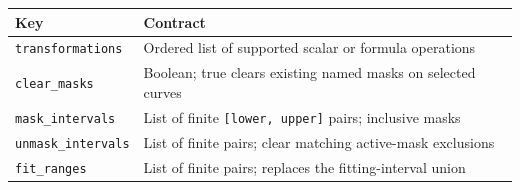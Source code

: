 \documentclass[
  10pt,
  a4paper,
  oneside]{scrreprt}
\begin{document}
\begin{longtable}[]{@{}ll@{}}
\toprule
\begin{minipage}[b]{0.47\columnwidth}\raggedright
Key\strut
\end{minipage} & \begin{minipage}[b]{0.47\columnwidth}\raggedright
Contract\strut
\end{minipage}\tabularnewline
\midrule
\endhead
\begin{minipage}[t]{0.47\columnwidth}\raggedright
\texttt{transformations}\strut
\end{minipage} & \begin{minipage}[t]{0.47\columnwidth}\raggedright
Ordered list of supported scalar or formula operations\strut
\end{minipage}\tabularnewline
\begin{minipage}[t]{0.47\columnwidth}\raggedright
\texttt{clear\_masks}\strut
\end{minipage} & \begin{minipage}[t]{0.47\columnwidth}\raggedright
Boolean; true clears existing named masks on selected curves\strut
\end{minipage}\tabularnewline
\begin{minipage}[t]{0.47\columnwidth}\raggedright
\texttt{mask\_intervals}\strut
\end{minipage} & \begin{minipage}[t]{0.47\columnwidth}\raggedright
List of finite \texttt{{[}lower,\ upper{]}} pairs; inclusive masks\strut
\end{minipage}\tabularnewline
\begin{minipage}[t]{0.47\columnwidth}\raggedright
\texttt{unmask\_intervals}\strut
\end{minipage} & \begin{minipage}[t]{0.47\columnwidth}\raggedright
List of finite pairs; clear matching active-mask exclusions\strut
\end{minipage}\tabularnewline
\begin{minipage}[t]{0.47\columnwidth}\raggedright
\texttt{fit\_ranges}\strut
\end{minipage} & \begin{minipage}[t]{0.47\columnwidth}\raggedright
List of finite pairs; replaces the fitting-interval union\strut
\end{minipage}\tabularnewline
\bottomrule
\end{longtable}
\end{document}
